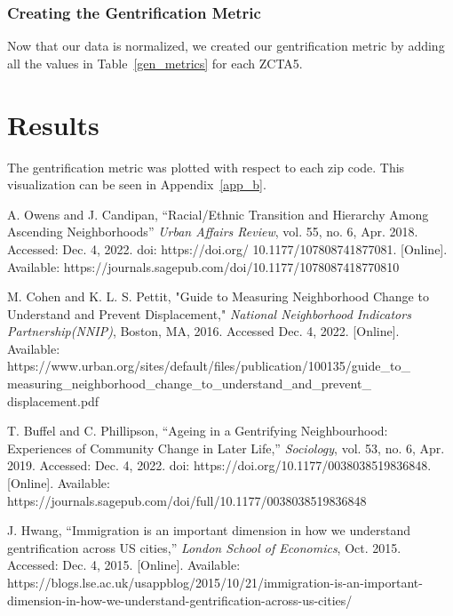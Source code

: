 \documentclass[conference]{IEEEtran}
\begin{document}
\subsubsection{Creating the Gentrification Metric}
Now that our data is normalized, we created our gentrification metric by adding all the values in Table~\ref{gen_metrics} for each ZCTA5.

\section{Results}
The gentrification metric was plotted with respect to each zip code. This visualization can be seen in Appendix~\ref{app_b}.

\begin{thebibliography}{00}
 A. Owens and J. Candipan, ``Racial/Ethnic Transition and Hierarchy Among Ascending Neighborhoods'' \textit{Urban Affairs Review}, vol. 55, no. 6, Apr. 2018. Accessed: Dec. 4, 2022. doi: https://doi.org/ 10.1177/107808741877081. [Online]. Available: https://journals.sagepub.com/doi/10.1177/1078087418770810

 M. Cohen and K. L. S. Pettit, "Guide to Measuring Neighborhood Change to Understand and Prevent Displacement," \textit{National Neighborhood Indicators Partnership(NNIP)}, Boston, MA, 2016. Accessed Dec. 4, 2022. [Online]. Available: https://www.urban.org/sites/default/files/publication/100135/guide\_to\_ measuring\_neighborhood\_change\_to\_understand\_and\_prevent\_ displacement.pdf

 T. Buffel and C. Phillipson, “Ageing in a Gentrifying Neighbourhood: Experiences of Community Change in Later Life,” \textit{Sociology}, vol. 53, no. 6, Apr. 2019. Accessed: Dec. 4, 2022. doi: https://doi.org/10.1177/0038038519836848. [Online]. Available: https://journals.sagepub.com/doi/full/10.1177/0038038519836848

 J. Hwang, “Immigration is an important dimension in how we understand gentrification across US cities,” \textit{London School of Economics}, Oct. 2015. Accessed: Dec. 4, 2015. [Online]. Available: https://blogs.lse.ac.uk/usappblog/2015/10/21/immigration-is-an-important-dimension-in-how-we-understand-gentrification-across-us-cities/ 


\end{thebibliography}
\end{document}
